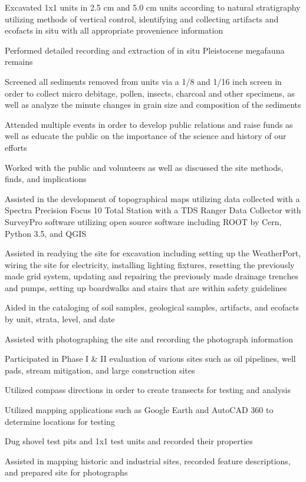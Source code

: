 \documentclass[letterpaper]{resume}
\begin{document}
\begin{compactitem}
\item Excavated 1x1 units in 2.5 cm and 5.0 cm units according to natural stratigraphy utilizing methods of vertical control, identifying and collecting artifacts and ecofacts in situ with all appropriate provenience information
\item Performed detailed recording and extraction of in situ Pleistocene megafauna remains
\item Screened all sediments removed from units via a 1/8 and 1/16 inch screen in order to collect micro debitage, pollen, insects, charcoal and other specimens, as well as analyze the minute changes in grain size and composition of the sediments
\item Attended multiple events in order to develop public relations and raise funds as well as educate the public on the importance of the science and history of our efforts
\item Worked with the public and volunteers as well as discussed the site methods, finds, and implications
\item Assisted in the development of topographical maps utilizing data collected with a Spectra Precision Focus 10 Total Station with a TDS Ranger Data Collector with SurveyPro software utilizing open source software including ROOT by Cern, Python 3.5, and QGIS
\item Assisted in readying the site for excavation including setting up the WeatherPort, wiring the site for electricity, installing lighting fixtures, resetting the previously made grid system, updating and repairing the previously made drainage trenches and pumps, setting up boardwalks and stairs that are within safety guidelines
\item Aided in the cataloging of soil samples, geological samples, artifacts, and ecofacts  by unit, strata, level, and date
\item Assisted with photographing the site and recording the photograph information
\end{compactitem}
%
\begin{compactitem}
\item Participated in Phase I \& II evaluation of various sites such as oil pipelines, well pads, stream mitigation, and large construction sites
\item Utilized compass directions in order to create transects for testing and analysis
\item Utilized mapping applications such as Google Earth and AutoCAD 360 to determine locations for testing
\item Dug shovel test pits and 1x1 test units and recorded their properties
\item Assisted in mapping historic and industrial sites, recorded feature descriptions, and prepared site for photographs
\end{compactitem}
\end{document}
